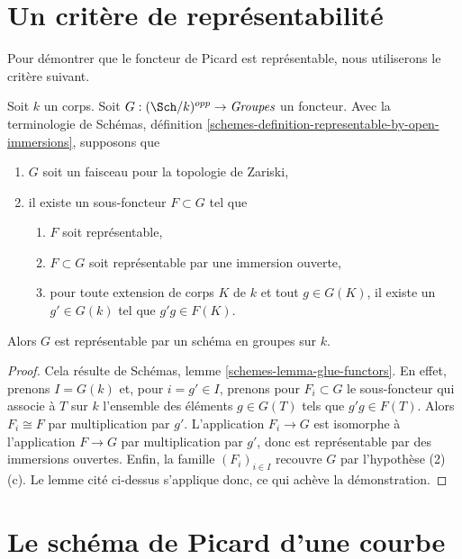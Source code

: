 \section{Un critère de représentabilité}
\label{section-representability}

\noindent
Pour démontrer que le foncteur de Picard est représentable, nous utiliserons le
critère suivant.

\begin{lemma}
\label{lemma-criterion}
Soit $k$ un corps. Soit $G : (\Sch/k)^{opp} \to \textit{Groupes}$ un
foncteur. Avec la terminologie de
Schémas, définition \ref{schemes-definition-representable-by-open-immersions},
supposons que
\begin{enumerate}
\item $G$ soit un faisceau pour la topologie de Zariski,
\item il existe un sous-foncteur $F \subset G$ tel que
\begin{enumerate}
\item $F$ soit représentable,
\item $F \subset G$ soit représentable par une immersion ouverte,
\item pour toute extension de corps $K$ de $k$ et tout $g \in G(K)$,
il existe un $g' \in G(k)$ tel que $g'g \in F(K)$.
\end{enumerate}
\end{enumerate}
Alors $G$ est représentable par un schéma en groupes sur $k$.
\end{lemma}

\begin{proof}
Cela résulte de Schémas, lemme \ref{schemes-lemma-glue-functors}.
En effet, prenons $I = G(k)$ et, pour $i = g' \in I$, prenons pour $F_i \subset G$
le sous-foncteur qui associe à $T$ sur $k$ l'ensemble des éléments
$g \in G(T)$ tels que $g'g \in F(T)$. Alors $F_i \cong F$ par multiplication
par $g'$. L'application $F_i \to G$ est isomorphe à l'application $F \to G$
par multiplication par $g'$, donc est représentable par des immersions ouvertes.
Enfin, la famille $(F_i)_{i \in I}$ recouvre $G$ par l'hypothèse (2)(c).
Le lemme cité ci-dessus s'applique donc, ce qui achève la démonstration.
\end{proof}



\section{Le schéma de Picard d'une courbe}
\label{section-picard-curve}

